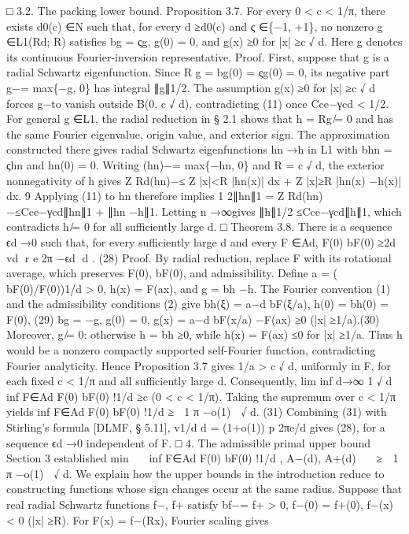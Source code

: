 □
3.2. The packing lower bound.
Proposition 3.7. For every 0 < c < 1/π, there exists d0(c) ∈N such that, for every d ≥d0(c)
and ς ∈\{−1, +1\}, no nonzero g ∈L1(Rd; R) satisﬁes bg = ςg, g(0) = 0, and g(x) ≥0 for
|x| ≥c
√
d. Here g denotes its continuous Fourier-inversion representative.
Proof. First, suppose that g is a radial Schwartz eigenfunction. Since
R g = bg(0) = ςg(0) = 0,
its negative part g−= max\{−g, 0\} has integral ∥g∥1/2. The assumption g(x) ≥0 for |x| ≥c
√
d
forces g−to vanish outside B(0, c
√
d), contradicting (11) once Cce−γcd < 1/2.
For general g ∈L1, the radial reduction in § 2.1 shows that h = Rg ̸= 0 and has the
same Fourier eigenvalue, origin value, and exterior sign. The approximation constructed there
gives radial Schwartz eigenfunctions hn →h in L1 with bhn = ςhn and hn(0) = 0. Writing
(hn)−= max\{−hn, 0\} and R = c
√
d, the exterior nonnegativity of h gives
Z
Rd(hn)−≤
Z
|x|<R
|hn(x)| dx +
Z
|x|≥R
|hn(x) −h(x)| dx.
9
Applying (11) to hn therefore implies
1
2∥hn∥1 =
Z
Rd(hn)−≤Cce−γcd∥hn∥1 + ∥hn −h∥1.
Letting n →∞gives ∥h∥1/2 ≤Cce−γcd∥h∥1, which contradicts h ̸= 0 for all suﬃciently large
d.
□
Theorem 3.8. There is a sequence ϵd →0 such that, for every suﬃciently large d and every
F ∈Ad,
F(0)
bF(0)
≥2d
vd
r e
2π −ϵd
d
.
(28)
Proof. By radial reduction, replace F with its rotational average, which preserves F(0), bF(0),
and admissibility. Deﬁne a = ( bF(0)/F(0))1/d > 0, h(x) = F(ax), and g = bh −h. The Fourier
convention (1) and the admissibility conditions (2) give
bh(ξ) = a−d bF(ξ/a),
h(0) = bh(0) = F(0),
(29)
bg = −g,
g(0) = 0,
g(x) = a−d bF(x/a) −F(ax) ≥0
(|x| ≥1/a).(30)
Moreover, g ̸= 0: otherwise h = bh ≥0, while h(x) = F(ax) ≤0 for |x| ≥1/a. Thus h would be
a nonzero compactly supported self-Fourier function, contradicting Fourier analyticity. Hence
Proposition 3.7 gives 1/a > c
√
d, uniformly in F, for each ﬁxed c < 1/π and all suﬃciently
large d. Consequently,
lim inf
d→∞
1
√
d
inf
F∈Ad
F(0)
bF(0)
!1/d
≥c
(0 < c < 1/π).
Taking the supremum over c < 1/π yields
inf
F∈Ad
F(0)
bF(0)
!1/d
≥
 1
π −o(1)
 √
d.
(31)
Combining (31) with Stirling’s formula [DLMF, § 5.11], v1/d
d
= (1+o(1))
p
2πe/d gives (28), for
a sequence ϵd →0 independent of F.
□
4. The admissible primal upper bound
Section 3 established
min


inf
F∈Ad
F(0)
bF(0)
!1/d
, A−(d), A+(d)


≥
 1
π −o(1)
 √
d.
We explain how the upper bounds in the introduction reduce to constructing functions whose
sign changes occur at the same radius. Suppose that real radial Schwartz functions f−, f+ satisfy
bf−= f+ > 0,
f−(0) = f+(0),
f−(x) < 0
(|x| ≥R).
For F(x) = f−(Rx), Fourier scaling gives
